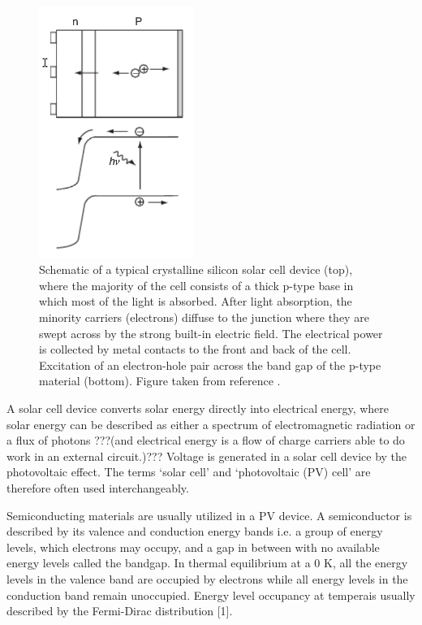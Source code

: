 \begin{figure}[h!]
  \centering
    \includegraphics[width=0.45\textwidth]{figures/PV_schematic.png}
    \caption{Schematic of a typical crystalline silicon solar cell device (top), where the majority of the cell consists of a thick p-type base in which most of the light is absorbed.  After light absorption, the minority carriers (electrons) diffuse to the junction where they are swept across by the strong built-in electric field. The electrical power is collected by metal contacts to the front and back of the cell. Excitation of an electron-hole pair across the band gap of the p-type material (bottom). 
    Figure taken from reference .}
  \label{PV_schematic}
\end{figure}

A solar cell device converts solar energy directly into electrical energy, where solar energy can be described as either a spectrum of electromagnetic radiation or a flux of photons ???(and electrical energy is a flow of charge carriers able to do work in an external circuit.)??? \cite{spatial_resolved_book} Voltage is generated in a solar cell device by the photovoltaic effect. The terms `solar cell' and `photovoltaic (PV) cell' are therefore often used interchangeably.  

Semiconducting materials are usually utilized in a PV device. A semiconductor is described by its valence and conduction energy
bands i.e. a group of energy levels, which electrons may occupy, and a gap in
between with no available energy levels called the bandgap. In thermal equilibrium
at a 0 K, all the energy levels in the valence band are occupied by electrons
while all energy levels in the conduction band remain unoccupied. Energy level
occupancy at temperais usually described by the Fermi-Dirac distribution [1]. \cite{spatial_resolved_book}

